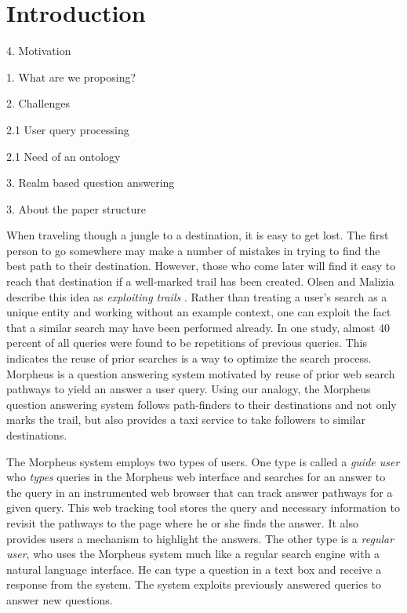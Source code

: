 \section{Introduction}


4. Motivation 

1. What are we proposing?  

2. Challenges

  2.1 User query processing 

  2.1 Need of an ontology 

3. Realm based question answering 

3. About the paper structure 


When traveling though a jungle to a destination, it is easy to get
lost.  The first person to go somewhere may make a number of mistakes
in trying to find the best path to their destination.  However, those
who come later will find it easy to reach that destination if a
well-marked trail has been created. Olsen and Malizia describe this
idea as \emph{exploiting trails} \cite{5379671}.  Rather than treating
a user's search as a unique entity and working without an example
context, one can exploit the fact that a similar search may have been
performed already.  In one study, almost 40 percent of all queries
were found to be repetitions of previous queries\cite{1277770}. This
indicates the reuse of prior searches is a way to optimize the search
process.  Morpheus is a question answering system motivated by reuse of prior web search pathways to yield an answer a user query. Using our analogy, the Morpheus question answering system follows path-finders to their destinations and not only marks the trail, but also provides a taxi service to take
followers to similar destinations.

The Morpheus system employs two types of users. One type is called a
\textit{guide user} who \textit{types} queries in the Morpheus web interface and
searches for an answer to the query in an instrumented web browser that can
track answer pathways for a given query. This web tracking tool stores the query
and necessary information to revisit the pathways to the page where he or she
finds the answer. It also provides users a mechanism to highlight the answers.
The other type is a \textit{regular user}, who uses the Morpheus system much
like a regular search engine with a natural language interface. He can type a
question in a text box and receive a response from the system. The system
exploits previously answered queries to answer new questions.

